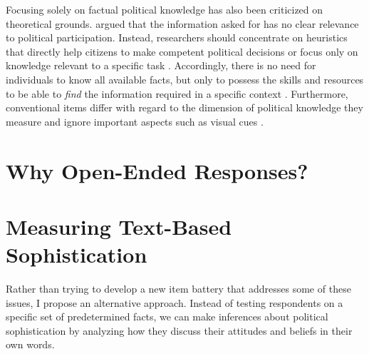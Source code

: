 \documentclass[12pt]{article}
\begin{document}
Focusing solely on factual political knowledge has also been criticized on theoretical grounds. \citet{lupia2006elitism} argued that the information asked for has no clear relevance to political participation. Instead, researchers should concentrate on heuristics that directly help citizens to make competent political decisions or focus only on knowledge relevant to a specific task \citep[see also][]{lupia1994shortcuts}. Accordingly, there is no need for individuals to know all available facts, but only to possess the skills and resources to be able to \textit{find} the information required in a specific context \citep{prior2008money}. Furthermore, conventional items differ with regard to the dimension of political knowledge they measure \citep{barabas2014question} and ignore important aspects such as visual cues \citep{prior2014visual}.


\section*{Why Open-Ended Responses?}



\section*{Measuring Text-Based Sophistication}


Rather than trying to develop a new item battery that addresses some of these issues, I propose an alternative approach. Instead of testing respondents on a specific set of predetermined facts, we can make inferences about political sophistication by analyzing how they discuss their attitudes and beliefs in their own words.
\end{document}
